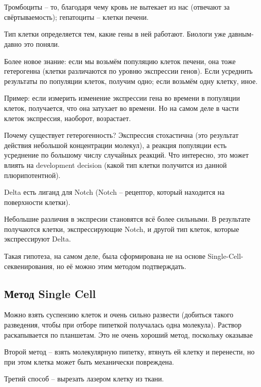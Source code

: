 \documentclass[main.tex]{subfiles}
\begin{document}
\section{}


Тромбоциты -- то, благодаря чему кровь не вытекает из нас (отвечают за свёртываемость); гепатоциты -- клетки печени.

Тип клетки определяется тем, какие гены в ней работают.
Биологи уже давным-давно это поняли.

Более новое знание: если мы возьмём популяцию клеток печени, она тоже гетерогенна (клетки различаются по уровню экспрессии генов).
Если усреднить результаты по популяции клеток, получим одно; если возьмём одну клетку, иное.

Пример: если измерить изменение экспрессии гена во времени в популяции клеток, получается, что она затухает во времени.
Но на самом деле в части клеток экспрессия, наоборот, возрастает.

Почему существует гетерогенность?
Экспрессия стохастична (это результат действия небольшой концентрации молекул), а реакция популяции есть усреднение по большому числу случайных реакций.
Что интересно, это может влиять на development decision (какой тип клетки получится из данной плюрипотентной).

Delta есть лиганд для Notch (Notch -- рецептор, который находится на поверхности клетки).

Небольшие различия в экспресии становятся всё более сильными.
В результате получаются клетки, экспрессирующие Notch, и другой тип клеток, которые экспрессируют Delta.

Такая гипотеза, на самом деле, была сформирована не на основе Single-Cell-секвенирования, но её можно этим методом подтверждать.

\subsection{Метод Single Cell}

Можно взять суспензию клеток и очень сильно развести (добиться такого разведения, чтобы при отборе пипеткой получалась одна молекула).
Раствор раскапывается по планшетам.
Это не очень хороший метод, поскольку оказывае

Второй метод -- взять молекулярную пипетку, втянуть ей клетку и перенести, но при этом клетка может быть механически повреждена.

Третий способ -- вырезать лазером клетку из ткани.
\end{document}
